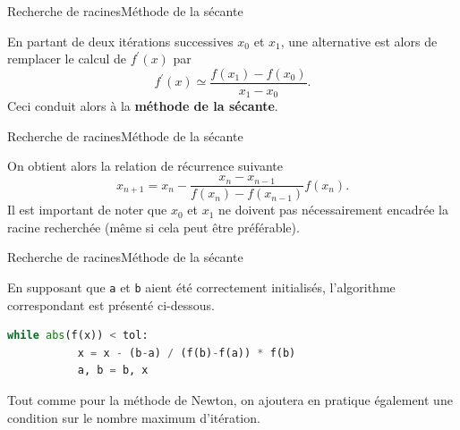 \documentclass[usenames,dvipsnames,svgnames,10pt,aspectratio=169]{beamer}
\begin{document}
\begin{frame}[t, c]{Recherche de racines}{Méthode de la sécante}
  \begin{minipage}{.68\textwidth}
    En partant de deux itérations successives $x_0$ et $x_1$, une alternative est alors de remplacer le calcul de $f^{\prime}(x)$ par
    \[
    f^{\prime}(x) \simeq \dfrac{f(x_1) - f(x_0)}{x_1 - x_0}.
    \]
    Ceci conduit alors à la \alert{\textbf{méthode de la sécante}}.
  \end{minipage}%
  \hfill
  \begin{minipage}{.28\textwidth}
  \end{minipage}
\end{frame}

\begin{frame}[t, c]{Recherche de racines}{Méthode de la sécante}
  \begin{minipage}{.68\textwidth}
    On obtient alors la relation de récurrence suivante
    \[
    x_{n+1} = x_n - \dfrac{x_n - x_{n-1}}{f(x_n) - f(x_{n-1})} f(x_n).
    \]
    Il est important de noter que $x_0$ et $x_1$ ne doivent pas nécessairement encadrée la racine recherchée (même si cela peut être préférable).
  \end{minipage}%
  \hfill
  \begin{minipage}{.28\textwidth}
  \end{minipage}
\end{frame}


\begin{frame}[t, c, fragile]{Recherche de racines}{Méthode de la sécante}
  \begin{minipage}{.68\textwidth}
    En supposant que \verb+a+ et \verb+b+ aient été correctement initialisés, l'algorithme correspondant est présenté ci-dessous.

    \bigskip

    \begin{lstlisting}[language=Python]
      while abs(f(x)) < tol:
           x = x - (b-a) / (f(b)-f(a)) * f(b)
           a, b = b, x
    \end{lstlisting}

    \bigskip

    Tout comme pour la méthode de Newton, on ajoutera en pratique également une condition sur le nombre maximum d'itération.
  \end{minipage}%
  \hfill
  \begin{minipage}{.28\textwidth}
  \end{minipage}
\end{frame}
\end{document}

